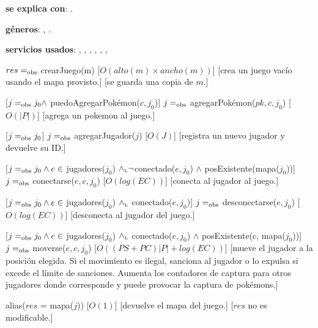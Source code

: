 \begin{Interfaz}

	\textbf{se explica con}: .

	\textbf{géneros}: , .

	\textbf{servicios usados}: , , , , , , 


	{$res =_{\mathrm{obs}}$ crearJuego(m)}
	[$O(alto(m) \times ancho(m))$]
	[crea un juego vacío usando el mapa provisto.]
	[se guarda una copia de $m$.]

	[$j =_{\mathrm{obs}} j_0 \land$ puedoAgregarPokémon($c,j_0$)]
	{$j =_{\mathrm{obs}}$ agregarPokémon($pk, c, j_0$)}
	[$O(|P|)$]
	[agrega un pokemon al juego.]

	[$j =_{\mathrm{obs}} j_0$]
	{$j =_{\mathrm{obs}}$ agregarJugador($j$)}
	[$O(J)$]
	[registra un nuevo jugador y devuelve su ID.]

	[$j =_{\mathrm{obs}} j_0 \land e \in$ jugadores($j_0$) $\land_{\mathrm{\scriptscriptstyle{L}}} \neg$conectado($e,j_0$) $\land$ posExistente(mapa($j_0$))]
	{$j =_{\mathrm{obs}}$ conectarse($e, c, j_0$)}
	[$O(log(EC))$]
	[conecta al jugador al juego.]

	[$j =_{\mathrm{obs}} j_0 \land e \in$ jugadores($j_0$) $\land_{\mathrm{\scriptscriptstyle{L}}}$ conectado($e,j_0$)]
	{$j =_{\mathrm{obs}}$ desconectarse($e, j_0$)}
	[$O(log(EC))$]
	[desconecta al jugador del juego.]

	[$j =_{\mathrm{obs}} j_0 \land e \in$ jugadores($j_0$) $\land_{\mathrm{\scriptscriptstyle{L}}}$ conectado($e,j_0$) $\land$ posExistente(c, mapa($j_0$))]
	{$j =_{\mathrm{obs}}$ moverse($e, c, j_0$)}
	[$O((PS + PC)|P| + log(EC))$]
	[mueve el jugador a la posición elegida. Si el movimiento es ilegal, sanciona al jugador o lo expulsa si excede el límite de sanciones. Aumenta los contadores de captura para otros jugadores donde corresponde y puede provocar la captura de pokémons.]

	{alias($res$ = mapa($j$))}
	[$O(1)$]
	[devuelve el mapa del juego.]
	[$res$ no es modificable.]


\end{Interfaz}
